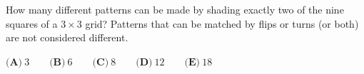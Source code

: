 How many different patterns can be made by shading exactly two of the nine squares of a $3\times3$ grid? Patterns that can be matched by flips or turns (or both) are not considered different.

$\textbf{(A)}\ 3\qquad\textbf{(B)}\ 6\qquad\textbf{(C)}\ 8\qquad\textbf{(D)}\ 12\qquad\textbf{(E)}\ 18$
